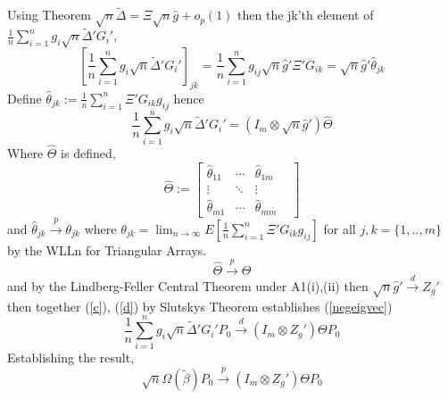 \documentclass[11pt, fleqn]{article}
\begin{document}
Using Theorem $\sqrt{n}\tilde{\Delta}=\Xi \sqrt{n}\hat{g}+o_p(1)$ then the jk'th element of $\frac{1}{n}\sum_{i=1}^ng_i\sqrt{n}\tilde{\Delta}'G_i'$,
\begin{equation}\left[\frac{1}{n}\sum_{i=1}^ng_i\sqrt{n}\tilde{\Delta}'G_i'\right]_{jk}=
\frac{1}{n}\sum_{i=1}^ng_{ij}\sqrt{n}\hat{g}'\Xi'G_{ik}=\sqrt{n}\hat{g}'\hat{\theta}_{jk}\end{equation}
Define $\hat{\theta}_{jk}:=\frac{1}{n}\sum_{i=1}^n\Xi'G_{ik}g_{ij}$ hence
\begin{equation}\frac{1}{n}\sum_{i=1}^ng_i\sqrt{n}\tilde{\Delta
}'G_i'=(I_m \otimes \sqrt{n}\hat{g}')\hat{\Theta}
 \end{equation}
Where $\hat{\Theta}$ is defined,
\begin{equation}\hat{\Theta}:=
\left[\begin{array}{cccc}
\hat{\theta}_{11} & \cdots & \hat{\theta}_{1m}\\
\vdots & \ddots & \vdots &  \\
\hat{ \theta}_{m1} & \cdots&  \hat{\theta}_{mm}\end{array}\right]
\end{equation}
and  $\hat{\theta}_{jk} \overset{p}{\rightarrow}\theta_{jk}$ where $\theta_{jk}=\lim_{n\rightarrow \infty} E\left[\frac{1}{n}\sum_{i=1}^n\Xi'G_{ik}g_{ij}\right]$  for all $j,k=\{1,..,m\}$ by the WLLn for Triangular Arrays. 
\begin{equation}\label{d}\hat{\Theta}\overset{p}{\rightarrow} \Theta\end{equation}
and by the Lindberg-Feller Central Theorem under A1(i),(ii) then $\sqrt{n}\hat{g}'\overset{d}{\rightarrow} Z_g'$ then together (\ref{c}), (\ref{d}) by Slutskys Theorem establishes (\ref{negeigvec})
\begin{equation} \frac{1}{n}\sum_{i=1}^ng_i\sqrt{n}\tilde{\Delta
}'G_i'P_0\overset{d}{\rightarrow} (I_m \otimes Z_g')\Theta P_0\end{equation}
Establishing the result,
\begin{equation}\sqrt{n}\hat{\Omega}(\tilde{\beta})P_0 \overset{p}{\rightarrow}(I_m \otimes Z_g')\Theta P_0 \end{equation}
\end{document}
